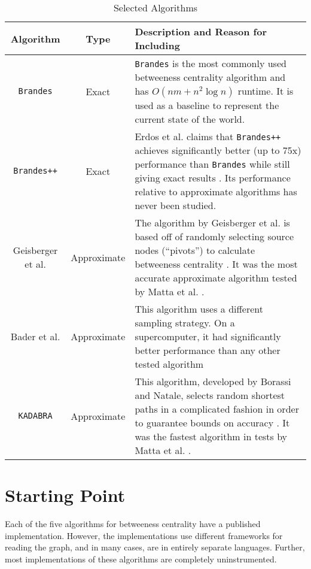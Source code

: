\documentclass[a4paper,12pt]{article}
\begin{document}
\begin{table}[h]
\renewcommand\arraystretch{1.5}
    \centering
    \caption{Selected Algorithms}
\begin{tabularx}{\linewidth}{|c|c|X|}
\hline 
Algorithm & Type & Description and Reason for Including \\ 
\hline 
\verb|Brandes| \cite{brandes} & Exact & \verb|Brandes| is the most commonly used betweeness centrality algorithm \cite{erdos} and has $O(nm+n^2 \log{n})$ runtime. It is used as a baseline to represent the current state of the world.\\ 
\hline 
\verb|Brandes++| \cite{erdos}& Exact & Erdos et al. claims that \verb|Brandes++| achieves significantly better (up to 75x) performance than \verb|Brandes| while still giving exact results \cite{erdos}. Its performance relative to approximate algorithms has never been studied.\\ 
\hline 
Geisberger et al. \cite{geisberger} & Approximate & The algorithm by Geisberger et al. is based off of randomly selecting source nodes (``pivots'') to calculate betweeness centrality \cite{geisberger}. It was the most accurate approximate algorithm tested by Matta et al. \cite{comparesmall}. \\ 
\hline 
Bader et al. \cite{bader} & Approximate & This algorithm uses a different sampling strategy. On a supercomputer, it had significantly better performance than any other tested algorithm \cite{comparebig}\\ 
\hline 
\verb|KADABRA| \cite{borassi}& Approximate & This algorithm, developed by Borassi and Natale, selects random shortest paths in a complicated fashion in order to guarantee bounds on accuracy \cite{borassi}. It was the fastest algorithm in tests by Matta et al. \cite{comparesmall}.\\ 
\hline 
\end{tabularx}
\label{tab:algorithms}
\end{table}

\section{Starting Point}

Each of the five algorithms for betweeness centrality have a published implementation. However, the implementations use different frameworks for reading the graph, and in many cases, are in entirely separate languages. Further, most implementations of these algorithms are completely uninstrumented.
\end{document}
